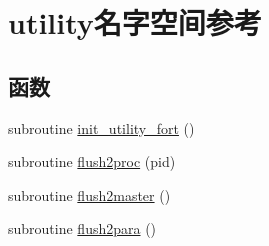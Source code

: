 \hypertarget{namespaceutility}{
\section{utility名字空间参考}
\label{namespaceutility}
}
\subsection*{函数}
\begin{DoxyCompactItemize}
\item 
subroutine \hyperlink{namespaceutility_aa465c4557a921fb97082d392421be1e7}{init\_\-utility\_\-fort} ()
\item 
subroutine \hyperlink{namespaceutility_af89f3f402d624699dfad6c027d71d0cd}{flush2proc} (pid)
\item 
subroutine \hyperlink{namespaceutility_a9253f21bd4ce5431fc25424cf9784dd2}{flush2master} ()
\item 
subroutine \hyperlink{namespaceutility_a923d7c8623e057e6cfda701520ce279d}{flush2para} ()
\end{DoxyCompactItemize}
